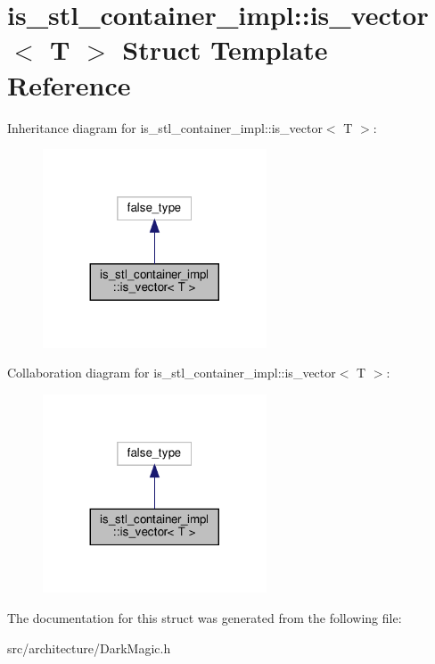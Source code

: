 \hypertarget{structis__stl__container__impl_1_1is__vector}{}\section{is\+\_\+stl\+\_\+container\+\_\+impl\+:\+:is\+\_\+vector$<$ T $>$ Struct Template Reference}
\label{structis__stl__container__impl_1_1is__vector}


Inheritance diagram for is\+\_\+stl\+\_\+container\+\_\+impl\+:\+:is\+\_\+vector$<$ T $>$\+:
\nopagebreak
\begin{figure}[H]
\begin{center}
\leavevmode
\includegraphics[width=188pt]{structis__stl__container__impl_1_1is__vector__inherit__graph}
\end{center}
\end{figure}


Collaboration diagram for is\+\_\+stl\+\_\+container\+\_\+impl\+:\+:is\+\_\+vector$<$ T $>$\+:
\nopagebreak
\begin{figure}[H]
\begin{center}
\leavevmode
\includegraphics[width=188pt]{structis__stl__container__impl_1_1is__vector__coll__graph}
\end{center}
\end{figure}


The documentation for this struct was generated from the following file\+:\begin{DoxyCompactItemize}
\item 
src/architecture/Dark\+Magic.\+h\end{DoxyCompactItemize}
